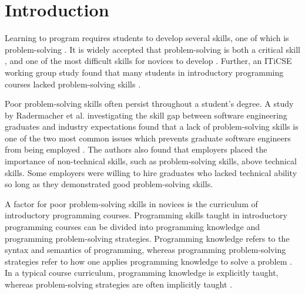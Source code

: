 \documentclass[sigconf,authorversion,nonacm]{acmart}
\begin{document}



\maketitle

\section{Introduction}
Learning to program requires students to develop several skills, one of which is problem-solving \cite{lakanen2015, bruce2003}. It is widely accepted that problem-solving is both a critical skill \cite{gomes2007}, and one of the most difficult skills for novices to develop \cite{medeiros2019}. Further, an ITiCSE working group study found that many students in introductory programming courses lacked problem-solving skills \cite{lister2004}.

Poor problem-solving skills often persist throughout a student's degree. A study by Radermacher et al. investigating the skill gap between software engineering graduates and industry expectations found that a lack of problem-solving skills is one of the two most common issues which prevents graduate software engineers from being employed \cite{radermacher2014}. The authors also found that employers placed the importance of non-technical skills, such as problem-solving skills, above technical skills. Some employers were willing to hire graduates who lacked technical ability so long as they demonstrated good problem-solving skills.

A factor for poor problem-solving skills in novices is the curriculum of introductory programming courses. Programming skills taught in introductory programming courses can be divided into programming knowledge and programming problem-solving strategies. Programming knowledge refers to the syntax and semantics of programming, whereas programming problem-solving strategies refer to how one applies programming knowledge to solve a problem \cite{deraat2009}. In a typical course curriculum, programming knowledge is explicitly taught, whereas problem-solving strategies are often implicitly taught \cite{muller2007}.
\end{document}
